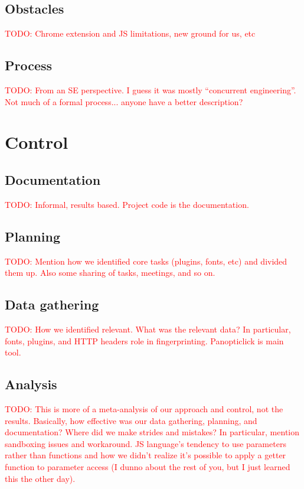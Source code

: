 \documentclass[12pt,a4paper]{article}
\begin{document}
\subsection{Obstacles}
\textcolor{red}{TODO: Chrome extension and JS limitations, new ground for us, etc}

\subsection{Process}
\textcolor{red}{TODO: From an SE perspective. I guess it was mostly ``concurrent engineering''. Not much of a formal process... anyone have a better description?}

\section{Control}
\subsection{Documentation}
\textcolor{red}{TODO: Informal, results based. Project code is the documentation.}

\subsection{Planning}
\textcolor{red}{TODO: Mention how we identified core tasks (plugins, fonts, etc) and divided them up. Also some sharing of tasks, meetings, and so on.}

\subsection{Data gathering}
\textcolor{red}{TODO: How we identified relevant. What was the relevant data? In particular, fonts, plugins, and HTTP headers role in fingerprinting. Panopticlick is main tool.}

\subsection{Analysis}
\textcolor{red}{TODO: This is more of a meta-analysis of our approach and control, not the results. Basically, how effective was our data gathering, planning, and documentation? Where did we make strides and mistakes? In particular, mention sandboxing issues and workaround. JS language's tendency to use parameters rather than functions and how we didn't realize it's possible to apply a getter function to parameter access (I dunno about the rest of you, but I just learned this the other day).}
\end{document}
